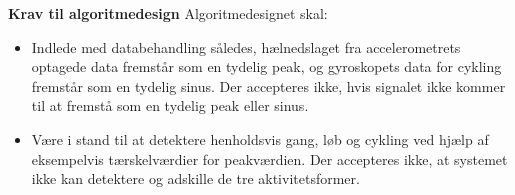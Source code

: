 \textbf{Krav til algoritmedesign} \newline 
Algoritmedesignet skal:
\begin{itemize}
	\item Indlede med databehandling således, hælnedslaget fra accelerometrets optagede data fremstår som en tydelig peak, og gyroskopets data for cykling fremstår som en tydelig sinus. Der accepteres ikke, hvis signalet ikke kommer til at fremstå som en tydelig peak eller sinus.
	\item Være i stand til at detektere henholdsvis gang, løb og cykling ved hjælp af eksempelvis tærskelværdier for peakværdien. Der accepteres ikke, at systemet ikke kan detektere og adskille de tre aktivitetsformer.
\end{itemize}

